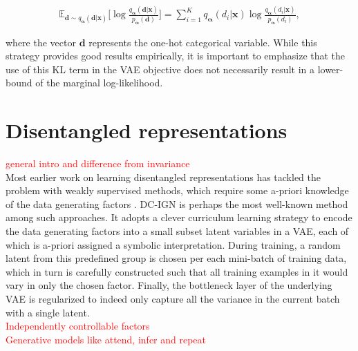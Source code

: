 \documentclass{report}
\newcommand\todo[1]{\textcolor{red}{#1}}
\begin{document}
\begin{equation}
\begin{gathered}
\mathbb{E}_{\boldsymbol{d} \sim q_{\boldsymbol{\alpha}}(\boldsymbol{d} | \boldsymbol{x})} \Big[ \log \frac{q_{\boldsymbol{\alpha}}(\boldsymbol{d} | \boldsymbol{x})}{p_{\boldsymbol{\alpha}} (\boldsymbol{d})} \Big] = \sum_{i=1}^K q_{\boldsymbol{\alpha}}(d_i | \boldsymbol{x}) \log \frac{q_{\boldsymbol{\alpha}}(d_i | \boldsymbol{x})}{p_{\boldsymbol{\alpha}}(d_i)},
\end{gathered}
\label{eq:analytic-discrete-kl}
\end{equation}

\bigskip

\noindent where the vector $\boldsymbol{d}$ represents the one-hot categorical variable. While this strategy provides good results empirically, it is important to emphasize that the use of this KL term in the VAE objective does not necessarily result in a lower-bound of the marginal log-likelihood.

\section{Disentangled representations}

\todo{general intro and difference from invariance} \\

\noindent Most earlier work on learning disentangled representations has tackled the problem with weakly supervised methods, which require some a-priori knowledge of the data generating factors \cite{transforming-ae, reed2014, yang2016}. DC-IGN \cite{dcign} is perhaps the most well-known method among such approaches. It adopts a clever curriculum learning \cite{bengio-curriculum} strategy to encode the data generating factors into a small subset latent variables in a VAE, each of which is a-priori assigned a symbolic interpretation. During training, a random latent from this predefined group is chosen per each mini-batch of training data, which in turn is carefully constructed such that all training examples in it would vary in only the chosen factor. Finally, the bottleneck layer of the underlying VAE is regularized to indeed only capture all the variance in the current batch with a single latent. \\

\noindent \todo{Independently controllable factors} \\

\noindent \todo{Generative models like attend, infer and repeat} \\
\end{document}
